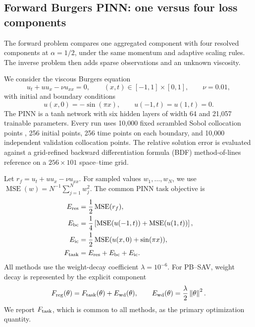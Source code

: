 \subsection{Forward Burgers PINN: one versus four loss components}
\label{sec:burgers-forward-experiment}

The forward problem compares one aggregated component with four resolved
components at \(\alpha=1/2\), under the same momentum and adaptive scaling
rules. The inverse problem then adds sparse observations and an unknown
viscosity.

We consider the viscous Burgers equation
\begin{equation}
  u_t+uu_x-\nu u_{xx}=0,
  \qquad (x,t)\in[-1,1]\times[0,1],
  \qquad \nu=0.01,
  \label{eq:burgers-forward-pde}
\end{equation}
with initial and boundary conditions
\begin{equation}
  u(x,0)=-\sin(\pi x),
  \qquad u(-1,t)=u(1,t)=0.
  \label{eq:burgers-forward-data}
\end{equation}
The PINN is a tanh network with six hidden layers of width 64 and 21,057
trainable parameters. Every run uses 10,000 fixed scrambled Sobol collocation
points \cite{sobol1967,owen1997}, 256 initial points, 256 time points on each
boundary, and 10,000
independent validation collocation points.  The relative solution error is
evaluated against a grid-refined backward differentiation formula (BDF)
method-of-lines reference on a
\(256\times101\) space--time grid.

Let \(r_f=u_t+uu_x-\nu u_{xx}\).
For sampled values \(w_1,\ldots,w_N\), we use
\(\operatorname{MSE}(w)=N^{-1}\sum_{j=1}^N w_j^2\).
The common PINN task objective is
\begin{subequations}
\label{eq:burgers-forward-losses}
\begin{align}
  E_{\rm res}
  &=\frac12\operatorname{MSE}(r_f),\\
  E_{\rm bc}
  &=\frac14\left[
    \operatorname{MSE}(u(-1,t))+
    \operatorname{MSE}(u(1,t))\right],\\
  E_{\rm ic}
  &=\frac12\operatorname{MSE}(u(x,0)+\sin(\pi x)),\\
  F_{\rm task}
  &=E_{\rm res}+E_{\rm bc}+E_{\rm ic}.
\end{align}
\end{subequations}
All methods use the weight-decay coefficient \(\lambda=10^{-6}\).  For
PB--SAV, weight decay is represented by the explicit component
\begin{equation}
  F_{\rm reg}(\theta)
  =F_{\rm task}(\theta)+E_{\rm wd}(\theta),
  \qquad
  E_{\rm wd}(\theta)=\frac{\lambda}{2}\left\lVert\theta\right\rVert^2.
  \label{eq:burgers-forward-regularized}
\end{equation}
We report \(F_{\rm task}\), which is common to all methods, as the primary
optimization quantity.

